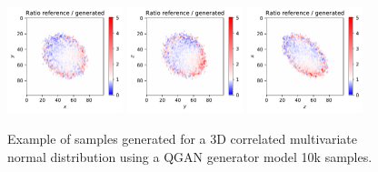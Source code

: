\documentclass[twocolumn,preprintnumbers,superscriptaddress]{revtex4-2}
\begin{document}
\begin{figure}
  \includegraphics[width=0.3\textwidth]{plots/3Dgaussian_posdef/1-2_RATIO_10k.pdf}%
  \includegraphics[width=0.3\textwidth]{plots/3Dgaussian_posdef/2-3_RATIO_10k.pdf}%
  \includegraphics[width=0.3\textwidth]{plots/3Dgaussian_posdef/3-1_RATIO_10k.pdf}

  \caption{\label{fig:3dgauss}Example of samples generated for a 3D correlated
  multivariate normal distribution using a QGAN generator model 10k samples.}
\end{figure}
\end{document}
